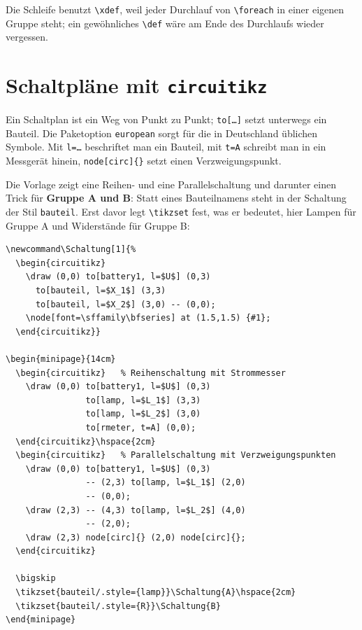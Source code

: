 Die Schleife benutzt \texttt{\textbackslash xdef}, weil jeder Durchlauf von \texttt{\textbackslash foreach} in einer eigenen Gruppe steht; ein gewöhnliches \texttt{\textbackslash def} wäre am Ende des Durchlaufs wieder vergessen.



\section{Schaltpläne mit \texttt{circuitikz}}

Ein Schaltplan ist ein Weg von Punkt zu Punkt; \texttt{to[\dots]} setzt unterwegs ein Bauteil. Die Paketoption \texttt{european} sorgt für die in Deutschland üblichen Symbole. Mit \texttt{l=\dots} beschriftet man ein Bauteil, mit \texttt{t=A} schreibt man in ein Messgerät hinein, \texttt{node[circ]\{\}} setzt einen Verzweigungspunkt.

Die Vorlage zeigt eine Reihen- und eine Parallelschaltung und darunter einen Trick für \textbf{Gruppe A und B}: Statt eines Bauteilnamens steht in der Schaltung der Stil \texttt{bauteil}. Erst davor legt \texttt{\textbackslash tikzset} fest, was er bedeutet, hier Lampen für Gruppe A und Widerstände für Gruppe B:

\begin{lstlisting}[style=latex]
% Eine Schaltung mit Platzhalter-Bauteil: was "bauteil" ist, legt man davor fest
\newcommand\Schaltung[1]{%
  \begin{circuitikz}
    \draw (0,0) to[battery1, l=$U$] (0,3)
      to[bauteil, l=$X_1$] (3,3)
      to[bauteil, l=$X_2$] (3,0) -- (0,0);
    \node[font=\sffamily\bfseries] at (1.5,1.5) {#1};
  \end{circuitikz}}

\begin{minipage}{14cm}
  \begin{circuitikz}   % Reihenschaltung mit Strommesser
    \draw (0,0) to[battery1, l=$U$] (0,3)
                to[lamp, l=$L_1$] (3,3)
                to[lamp, l=$L_2$] (3,0)
                to[rmeter, t=A] (0,0);
  \end{circuitikz}\hspace{2cm}
  \begin{circuitikz}   % Parallelschaltung mit Verzweigungspunkten
    \draw (0,0) to[battery1, l=$U$] (0,3)
                -- (2,3) to[lamp, l=$L_1$] (2,0)
                -- (0,0);
    \draw (2,3) -- (4,3) to[lamp, l=$L_2$] (4,0)
                -- (2,0);
    \draw (2,3) node[circ]{} (2,0) node[circ]{};
  \end{circuitikz}

  \bigskip
  \tikzset{bauteil/.style={lamp}}\Schaltung{A}\hspace{2cm}
  \tikzset{bauteil/.style={R}}\Schaltung{B}
\end{minipage}
\end{lstlisting}

